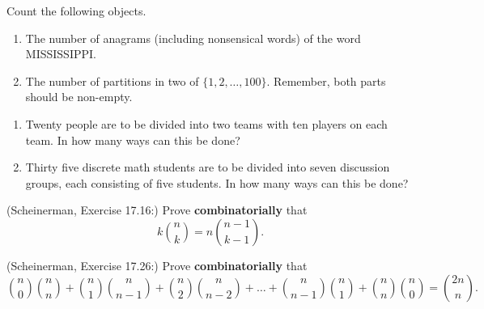 \documentclass{article}
\theoremstyle{definition}
\begin{document}
\begin{question}
    Count the following objects.
    	\begin{enumerate}
    	\item The number of anagrams (including nonsensical words) of the word MISSISSIPPI.
   	 \item The number of partitions in two of $\{1, 2, \dots, 100 \}$. Remember, both parts should be non-empty.
   	\end{enumerate}
\end{question}
\begin{solution}
\end{solution}




\begin{question}
    \begin{enumerate}
        \item Twenty people are to be divided into two teams with ten players on each team.  In how many ways can this be 	
        done?
        \item Thirty five discrete math students are to be divided into seven discussion groups, each consisting of five students.  
        In how many ways can this be done?
    \end{enumerate}
\end{question}
\begin{solution}
\end{solution}


\begin{question}
    (Scheinerman, Exercise 17.16:)
    Prove \textbf{combinatorially} that
    \[ k \binom{n}{k}  = n \binom{n-1}{k-1}. \]
\end{question}
\begin{solution}
\end{solution}


\begin{question}
    (Scheinerman, Exercise 17.26:)
    Prove \textbf{combinatorially} that
    \[ \binom{n}{0}\binom{n}{n} + \binom{n}{1} \binom{n}{n-1} + \binom{n}{2}\binom{n}{n-2} + \ldots + \binom{n}{n-1}\binom{n}{1} + \binom{n}{n}\binom{n}{0} = \binom{2n}{n}. \]
\end{question}
\begin{solution}
\end{solution}
\end{document}
